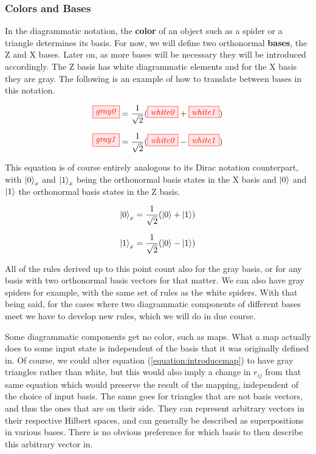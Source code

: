 \documentclass[]{article}
\begin{document}
\subsubsection{Colors and Bases}
\label{coloursandbases}

In the diagrammatic notation, the \textbf{color} of an object such as a spider or a triangle determines its basis. For now, we will define two orthonormal \textbf{bases}, the Z and X bases. Later on, as more bases will be necessary they will be introduced accordingly. The Z basis has white diagrammatic elements and for the X basis they are gray. The following is an example of how to translate between bases in this notation.

\begin{equation}
\label{equation:gray0}
\tikzfig{gray0} =\frac{1}{\sqrt{2}}( \tikzfig{white0} + \tikzfig{white1})
\end{equation}

\begin{equation}
\label{equation:gray1}
\tikzfig{gray1} =\frac{1}{\sqrt{2}}( \tikzfig{white0} - \tikzfig{white1})
\end{equation}

This equation is of course entirely analogous to its Dirac notation counterpart, with $\ket{0}_x$ and $\ket{1}_x$ being the orthonormal basis states in the X basis and $\ket{0}$ and $\ket{1}$ the orthonormal basis states in the Z basis.

\begin{equation}
\ket{0}_x = \frac{1}{\sqrt{2}}(\ket{0} + \ket{1})
\end{equation}

\begin{equation}
\ket{1}_x = \frac{1}{\sqrt{2}}(\ket{0} - \ket{1})
\end{equation}

All of the rules derived up to this point count also for the gray basis, or for any basis with two orthonormal basis vectors for that matter. We can also have gray spiders for example, with the same set of rules as the white spiders. With that being said, for the cases where two diagrammatic components of different bases meet we have to develop new rules, which we will do in due course. 

Some diagrammatic components get no color, such as maps. What a map actually does to some input state is independent of the basis that it was originally defined in. Of course, we could alter equation (\ref{equation:introducemap}) to have gray triangles rather than white, but this would also imply a change in $r_{ij}$ from that same equation which would preserve the result of the mapping, independent of the choice of input basis. The same goes for triangles that are not basis vectors, and thus the ones that are on their side. They can represent arbitrary vectors in their respective Hilbert spaces, and can generally be described as superpositions in various bases. There is no obvious preference for which basis to then describe this arbitrary vector in.
\end{document}
